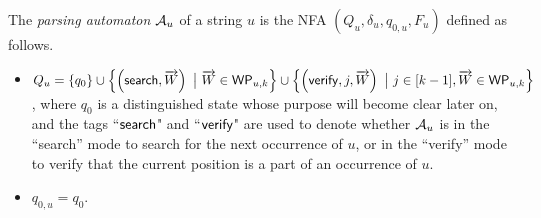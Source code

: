 \begin{definition}
The \emph{parsing automaton} $\mathcal{A}_u$ of a string $u$ is the NFA $(Q_u, \delta_u, q_{0,u}, F_u)$ defined as follows.
\begin{itemize}
	\item  $Q_u =\left\{q_0 \right\} \cup \left\{ \left(\mathsf{search}, \overrightarrow{W} \right)\ \big\vert\ \overrightarrow{W} \in \mathsf{WP}_{u, k} \right\} \cup  \left\{ \left(\mathsf{verify}, j, \overrightarrow{W} \right) \ \big\vert\ j \in [k-1], \overrightarrow{W} \in \mathsf{WP}_{u,k} \right\}$, where $q_0$ is a distinguished state whose purpose will become clear later on,  and the tags ``$\mathsf{search}$" and ``$\mathsf{verify}$" are used to denote whether $\mathcal{A}_u$ is in the ``search'' mode to search for the next occurrence of $u$, or in the ``verify'' mode to verify that the current position is a part of an occurrence of $u$.
	\item $q_{0,u}=q_0$.


\end{itemize}
\end{definition}
